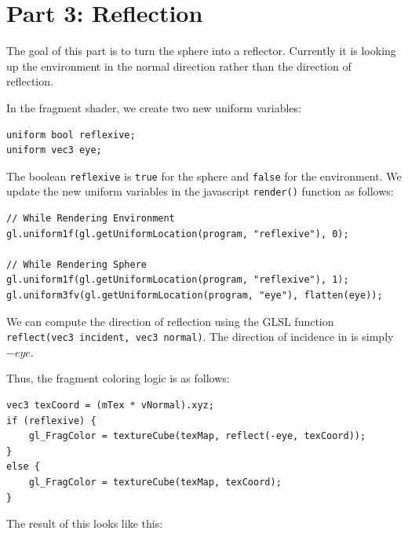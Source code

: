 \documentclass[12pt]{article}
\begin{document}
\newpage

\section*{Part 3: Reflection}

The goal of this part is to turn the sphere into a reflector. Currently it is looking up the environment in the normal direction rather than the direction of reflection.

In the fragment shader, we create two new uniform variables:

\begin{verbatim}
uniform bool reflexive;
uniform vec3 eye;
\end{verbatim}

The boolean \texttt{reflexive} is \texttt{true} for the sphere and \texttt{false} for the environment. We update the new uniform variables in the javascript \texttt{render()} function as follows:

\begin{verbatim}
// While Rendering Environment
gl.uniform1f(gl.getUniformLocation(program, "reflexive"), 0);

// While Rendering Sphere
gl.uniform1f(gl.getUniformLocation(program, "reflexive"), 1);
gl.uniform3fv(gl.getUniformLocation(program, "eye"), flatten(eye));   
\end{verbatim}

We can compute the direction of reflection using the GLSL function \texttt{reflect(vec3 incident, vec3 normal)}. The direction of incidence in is simply $-eye$.

Thus, the fragment coloring logic is as follows:

\begin{verbatim}
vec3 texCoord = (mTex * vNormal).xyz;
if (reflexive) {
    gl_FragColor = textureCube(texMap, reflect(-eye, texCoord));
}
else {
    gl_FragColor = textureCube(texMap, texCoord);
}
\end{verbatim}

The result of this looks like this:
\end{document}
